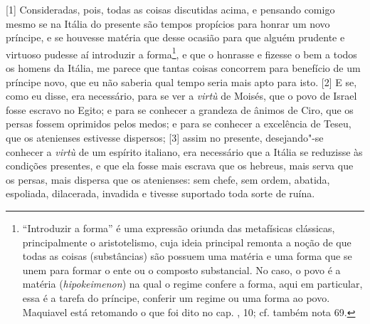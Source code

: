 
{[}1{]} Consideradas, pois, todas as coisas discutidas acima, e pensando
comigo mesmo se na Itália do presente são tempos propícios para honrar
um novo príncipe, e se houvesse matéria que desse ocasião para que
alguém prudente e virtuoso pudesse aí introduzir a forma\footnote{``Introduzir
  a forma'' é uma expressão oriunda das metafísicas clássicas,
  principalmente o aristotelismo, cuja ideia principal remonta a noção
  de que todas as coisas (substâncias) são possuem uma matéria e uma
  forma que se unem para formar o ente ou o composto substancial. No
  caso, o povo é a matéria (\emph{hipokeimenon}) na qual o regime
  confere a forma, aqui em particular, essa é a tarefa do príncipe,
  conferir um regime ou uma forma ao povo. Maquiavel está retomando o
  que foi dito no cap. , 10; cf. também nota 69.}, e que o honrasse e
fizesse o bem a todos os homens da Itália, me parece que tantas coisas
concorrem para benefício de um príncipe novo, que eu não saberia qual
tempo seria mais apto para isto. {[}2{]} E se, como eu disse, era
necessário, para se ver a \emph{virtù} de Moisés, que o povo de Israel
fosse escravo no Egito; e para se conhecer a grandeza de ânimos de Ciro,
que os persas fossem oprimidos pelos medos; e para se conhecer a
excelência de Teseu, que os atenienses estivesse dispersos; {[}3{]}
assim no presente, desejando"-se conhecer a \emph{virtù} de um espírito
italiano, era necessário que a Itália se reduzisse às condições
presentes, e que ela fosse mais escrava que os hebreus, mais serva que
os persas, mais dispersa que os atenienses: sem chefe, sem ordem,
abatida, espoliada, dilacerada, invadida e tivesse suportado toda sorte
de ruína.

